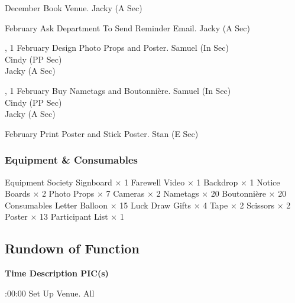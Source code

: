 \bTR{}
\eTD{} December
\eTD\bTD Book Venue.
\eTD\bTD Jacky (A Sec)
\eTD\eTR

\bTR{}
\eTD{} February
\eTD\bTD Ask Department To Send Reminder Email.
\eTD\bTD Jacky (A Sec)
\eTD\eTR

\bTR{}, 1
\eTD{} February
\eTD\bTD Design Photo Props and Poster.
\eTD\bTD Samuel (In Sec) \\ Cindy (PP Sec) \\ Jacky (A Sec)
\eTD\eTR

\bTR{}, 1
\eTD{} February
\eTD\bTD Buy Nametags and Boutonnière.
\eTD\bTD Samuel (In Sec) \\ Cindy (PP Sec) \\ Jacky (A Sec)
\eTD\eTR

\bTR{}
\eTD{} February
\eTD\bTD Print Poster and Stick Poster.
\eTD\bTD Stan (E Sec)
\eTD\eTR

\eTABLEbody
\eTABLE

\subsubsection{Equipment \& Consumables}
\starttabulate[|l|l|]
\NC{}Equipment\NC\NR
\HL
\NC Society Signboard \NC $\times$ 1 \NR
\NC Farewell Video \NC $\times$ 1 \NR
\NC Backdrop \NC $\times$ 1 \NR
\NC Notice Boards \NC $\times$ 2 \NR
\NC Photo Props \NC $\times$ 7 \NR
\NC Cameras \NC $\times$ 2 \NR
\NC Nametags \NC $\times$ 20 \NR
\NC Boutonnière \NC $\times$ 20 \NR
\HL
\NR
\NC{}Consumables\NC\NR
\HL
\NC Letter Balloon \NC $\times$ 15 \NR
\NC Luck Draw Gifts \NC $\times$ 4 \NR
\NC Tape \NC $\times$ 2 \NR
\NC Scissors \NC $\times$ 2 \NR
\NC Poster \NC $\times$ 13 \NR
\NC Participant List \NC $\times$ 1 \NR
\HL
\stoptabulate

\subsection{Rundown of Function}

\setupTABLE[c][1][width=1.25in]
\setupTABLE[c][2][width=3.5in]
\setupTABLE[c][3][width=1.25in]
\bTABLE
\bTABLEhead

\bTR\bTH    \bf{Time}
\eTH\bTH    \bf{Description}
\eTH\bTH    \bf{PIC(s)}
\eTH\eTR

\eTABLEhead
\bTABLEbody

\bTR{}:00:00
\eTD\bTD Set Up Venue.
\eTD\bTD All
\eTD\eTR

